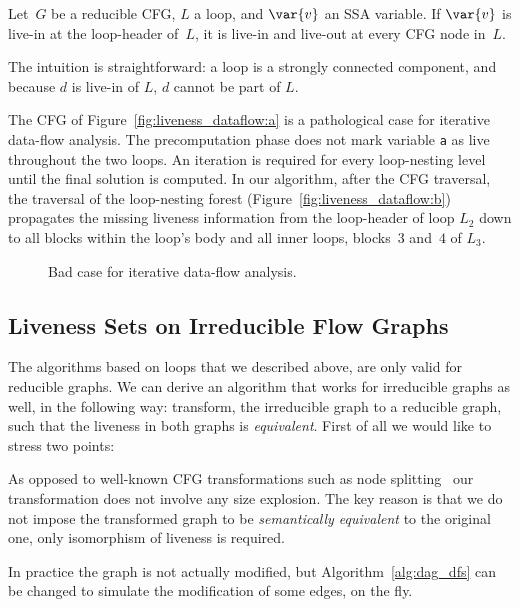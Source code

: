 \begin{lemma}
	\label{lemma:secondpass}
	Let~$G$ be a reducible CFG, $L$ a loop, and $\var{v}$ an SSA variable.
	If $\var{v}$ is live-in at the loop-header of~$L$, it is live-in and live-out at every CFG node in~$L$.
\end{lemma}

The intuition is straightforward: a loop is a strongly connected component, and because $d$ is live-in of $L$, $d$ cannot be part of $L$. 

\begin{example}
	The CFG of Figure~\ref{fig:liveness_dataflow:a} is a pathological case for iterative data-flow analysis.
	The precomputation phase does not mark variable \texttt{a} as live throughout the two loops.
	An iteration is required for every loop-nesting level until the final solution is computed.
	In our algorithm, after the CFG traversal, the traversal of the loop-nesting forest (Figure~\ref{fig:liveness_dataflow:b}) propagates the missing liveness information from the loop-header of loop $L_2$ down to all blocks within the loop's body and all inner loops, \ie blocks~$3$ and~$4$ of $L_3$.
\end{example}

\begin{figure}[t]
   \begin{center}
   \end{center}
   \caption{Bad case for iterative data-flow analysis.}
   \label{fig:liveness_dataflow}
\end{figure}


 \subsection{Liveness Sets on Irreducible Flow Graphs}
\label{sec:irreducible}

The algorithms based on loops that we described above, are only valid for reducible graphs.
We can derive an algorithm that works for irreducible graphs as well, in the following way:
transform, the irreducible graph to a reducible graph, such that the liveness in both graphs is \emph{equivalent}.
First of all we would like to stress two points:
\begin{asparaenum}[(1)]
\item
	As opposed to well-known CFG transformations such as node splitting~\cite{JC97,ASU06} our transformation does not involve any size explosion.
The key reason is that we do not impose the transformed graph to be \emph{semantically equivalent} to the original one, only isomorphism of liveness is required.
\item
	In practice the graph is not actually modified, but Algorithm~\ref{alg:dag_dfs} can be changed to simulate the modification of some edges, on the fly.
\end{asparaenum}

